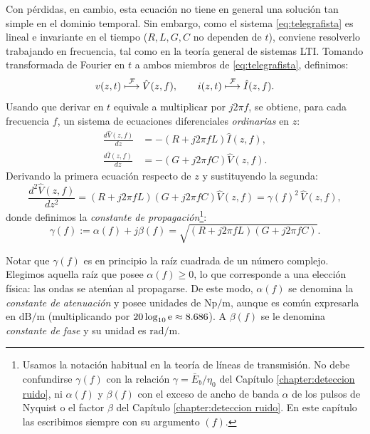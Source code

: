Con pérdidas, en cambio, esta ecuación no tiene en general una solución tan simple en el dominio temporal. Sin embargo, como el sistema \eqref{eq:telegrafista} es lineal e invariante en el tiempo ($R,L,G,C$ no dependen de $t$), conviene resolverlo trabajando en frecuencia, tal como en la teoría general de sistemas LTI. Tomando transformada de Fourier en $t$ a ambos miembros de \eqref{eq:telegrafista}, definimos:
\begin{equation*}
v(z,t) \;\displaystyle{\mathop{\longmapsto}^{\mathcal{F}}}\; \hat{V}(z,f), \quad \quad i(z,t) \;\displaystyle{\mathop{\longmapsto}^{\mathcal{F}}}\; \hat{I}(z,f).
\end{equation*}
Usando que derivar en $t$ equivale a multiplicar por $j2\pi f$, se obtiene, para cada frecuencia $f$, un sistema de ecuaciones diferenciales \emph{ordinarias} en $z$:
\begin{equation}\label{eq:telegrafista fourier}
    \begin{aligned}
        \frac{d\hat{V}(z,f)}{dz} &= -\left(R+j2\pi f L\right)\hat{I}(z,f), \\
        \frac{d\hat{I}(z,f)}{dz} &= -\left(G+j2\pi f C\right)\hat{V}(z,f).
    \end{aligned}
\end{equation}
Derivando la primera ecuación respecto de $z$ y sustituyendo la segunda:
\begin{equation}\label{eq:onda perdida fourier}
    \frac{d^2\hat{V}(z,f)}{dz^2} = \left(R+j2\pi f L\right)\left(G+j2\pi f C\right) \hat{V}(z,f) = \gamma(f)^2\, \hat{V}(z,f),
\end{equation}
donde definimos la \emph{constante de propagación}\footnote{Usamos la notación habitual en la teoría de líneas de transmisión. No debe confundirse $\gamma(f)$ con la relación $\gamma=\bar E_b/\eta_0$ del Capítulo \ref{chapter:deteccion ruido}, ni $\alpha(f)$ y $\beta(f)$ con el exceso de ancho de banda $\alpha$ de los pulsos de Nyquist o el factor $\beta$ del Capítulo \ref{chapter:deteccion ruido}. En este capítulo las escribimos siempre con su argumento $(f)$.}:
\begin{equation}\label{eq:gamma}
    \gamma(f) := \alpha(f) + j\beta(f) = \sqrt{\left(R+j2\pi f L\right)\left(G+j2\pi f C\right)}.
\end{equation}

Notar que $\gamma(f)$ es en principio la raíz cuadrada de un número complejo. Elegimos aquella raíz que posee $\alpha(f)\geqslant 0$, lo que corresponde a una elección física: las ondas se atenúan al propagarse. De este modo, $\alpha(f)$ se denomina la \emph{constante de atenuación} y posee unidades de $\unit{\neper\per\meter}$, aunque es común expresarla en $\unit{\deci\bel\per\meter}$ (multiplicando por $20\log_{10}\mathrm{e}\approx 8.686$). A $\beta(f)$ se le denomina \emph{constante de fase} y su unidad es $\unit{\radian\per\meter}$.

